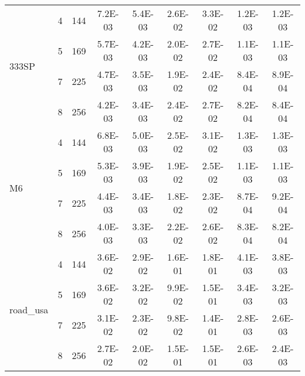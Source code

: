 \begin{tabular}[c]{| l | c | c | c | c | c | c | c | c |}
\multirow{4}{*}{333SP}  & 4 & 144 & 7.2E-03  & 5.4E-03  & 2.6E-02  & 3.3E-02  & 1.2E-03  & 1.2E-03   \\ \cline{2-9}
 & 5 & 169 & 5.7E-03  & 4.2E-03  & 2.0E-02  & 2.7E-02  & 1.1E-03  & 1.1E-03   \\ \cline{2-9}
 & 7 & 225 & 4.7E-03  & 3.5E-03  & 1.9E-02  & 2.4E-02  & 8.4E-04  & 8.9E-04   \\ \cline{2-9}
 & 8 & 256 & 4.2E-03  & 3.4E-03  & 2.4E-02  & 2.7E-02  & 8.2E-04  & 8.4E-04   \\ \hline
\multirow{4}{*}{M6}  & 4 & 144 & 6.8E-03  & 5.0E-03  & 2.5E-02  & 3.1E-02  & 1.3E-03  & 1.3E-03   \\ \cline{2-9}
 & 5 & 169 & 5.3E-03  & 3.9E-03  & 1.9E-02  & 2.5E-02  & 1.1E-03  & 1.1E-03   \\ \cline{2-9}
 & 7 & 225 & 4.4E-03  & 3.4E-03  & 1.8E-02  & 2.3E-02  & 8.7E-04  & 9.2E-04   \\ \cline{2-9}
 & 8 & 256 & 4.0E-03  & 3.3E-03  & 2.2E-02  & 2.6E-02  & 8.3E-04  & 8.2E-04   \\ \hline
\multirow{4}{*}{road\_usa}  & 4 & 144 & 3.6E-02  & 2.9E-02  & 1.6E-01  & 1.8E-01  & 4.1E-03  & 3.8E-03   \\ \cline{2-9}
 & 5 & 169 & 3.6E-02  & 3.2E-02  & 9.9E-02  & 1.5E-01  & 3.4E-03  & 3.2E-03   \\ \cline{2-9}
 & 7 & 225 & 3.1E-02  & 2.3E-02  & 9.8E-02  & 1.4E-01  & 2.8E-03  & 2.6E-03   \\ \cline{2-9}
 & 8 & 256 & 2.7E-02  & 2.0E-02  & 1.5E-01  & 1.5E-01  & 2.6E-03  & 2.4E-03   \\ \hline
\end{tabular}